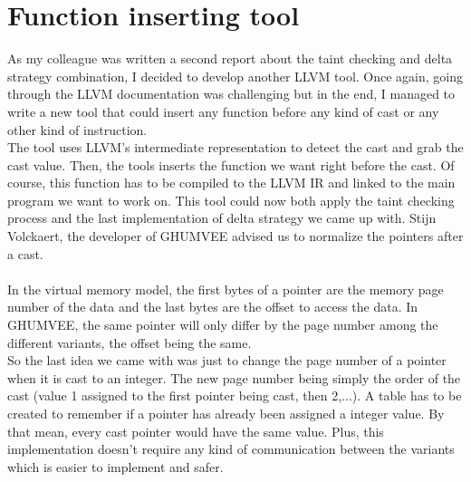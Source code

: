 \documentclass[english]{enstaPRE}
\begin{document}
\section{Function inserting tool}

As my colleague was written a second report about the taint checking and delta strategy combination, I decided to develop another 
LLVM tool. Once again, going through the LLVM documentation was challenging but in the end, I managed to write a new tool that could
insert any function before any kind of cast or any other kind of instruction. \\ 
The tool uses LLVM's intermediate representation to detect the cast and grab the cast value. Then, the tools inserts the function we
want right before the cast. Of course, this function has to be compiled to the LLVM IR and linked to the main program we want to
work on.
This tool could now both apply the taint checking process and the last implementation of delta strategy we came up with.
Stijn Volckaert, the developer of GHUMVEE advised us to normalize the pointers after a cast. \\ \\
In the virtual memory model, the first bytes of a pointer are the memory page number of the data and the last bytes are the offset
to access the data. In GHUMVEE, the same pointer will only differ by the page number among the different variants, the offset 
being the same. \\ So the last idea we came with was just to change the page number of a pointer when it is cast to an integer.
The new page number being simply the order of the cast (value 1 assigned to the first pointer being cast, then 2,...).
A table has to be created to remember if a pointer has already been assigned a integer value.
By that mean, every cast pointer would have the same value. Plus, this implementation doesn't require any kind of communication between
the variants which is easier to implement and safer.\\
 \\
\end{document}
